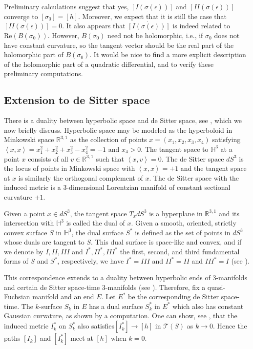 \documentclass{amsart}
\newcommand{\R}{\mathbb{R}}
\renewcommand{\H}{\mathbb{H}}
\newcommand{\two}{I\!\!I}
\begin{document}
Preliminary calculations suggest that yes, $[I(\sigma(\epsilon))]$ and $[\two(\sigma(\epsilon))]$ converge to $[\sigma_0] = [h]$.
Moreover, we expect that it is still the case that $\dot{[\two(\sigma(\epsilon))]} = 0$.
It also appears that $\dot{[I(\sigma(\epsilon))]}$ is indeed related to $\mathrm{Re}(B(\sigma_0))$. 
However, $B(\sigma_0)$ need not be holomorphic, i.e., if $\sigma_0$ does not have constant curvature, so the tangent vector should be the real part of the holomorphic part of $B(\sigma_0)$. 
It would be nice to find a more explicit description of the holomorphic part of a quadratic differential, and to verify these preliminary computations.  



\subsection{Extension to de Sitter space}



There is a duality between hyperbolic space and de Sitter space, see \cite{schlenker2002}, which we now briefly discuss. 
Hyperbolic space may be modeled as the hyperboloid in Minkowski space $\R^{3,1}$ as the collection of points $x = (x_1,x_2,x_3,x_4)$ satisfying $\left< x , x \right> = x_1^2 + x_2^2 + x_3^2 - x_4^2 = -1$ and $x_4 > 0$. 
The tangent space to $\H^3$ at a point $x$ consists of all $v \in \R^{3,1}$ such that $\left<x,v\right> = 0$.
The de Sitter space $dS^3$ is the locus of points in Minkowski space with $\left<x,x\right> = + 1$ and the tangent space at $x$ is similarly the orthogonal complement of $x$.
The de Sitter space with the induced metric is a 3-dimensional Lorentzian manifold of constant sectional curvature $+1$. 

Given a point $x \in dS^3$, the tangent space $T_xdS^3$ is a hyperplane in $\R^{3,1}$ and its intersection with $\H^3$ is called the dual of $x$.
Given a smooth, oriented, strictly convex surface $S$ in $\H^3$, the dual surface $S^*$ is defined as the set of points in $dS^3$ whose duals are tangent to $S$.
This dual surface is space-like and convex, and if we denote by $I,\two, I\!\!I\!\!I$ and $I^*,\two^*,I\!\!I\!\!I^*$ the first, second, and third fundamental forms of $S$ and $S^*$, respectively, we have $I^* = I\!\!I\!\!I$ and $\two^* = \two$ and $I\!\!I\!\!I^* = I$ (see \cite{labourie1992}).

This correspondence extends to a duality between hyperbolic ends of 3-manifolds and certain de Sitter space-time 3-manifolds (see \cite{mess2007}).
Therefore, fix a quasi-Fuchsian manifold and an end $E$.
Let $E^*$ be the corresponding de Sitter space-time.
The $k$-surface $S_k$ in $E$ has a dual surface $S_k^*$ in $E^*$ which also has constant Gaussian curvature, as shown by a computation. 
One can show, see \cite{labourie1992}, that the induced metric $I_k^*$ on $S_k^*$ also satisfies$[I_k^*] \to [h]$ in $\mathcal{T}(S)$ as $k \to 0$. 
Hence the paths $[I_k]$ and $[I_k^*]$ meet at $[h]$ when $k = 0$. 
\end{document}
